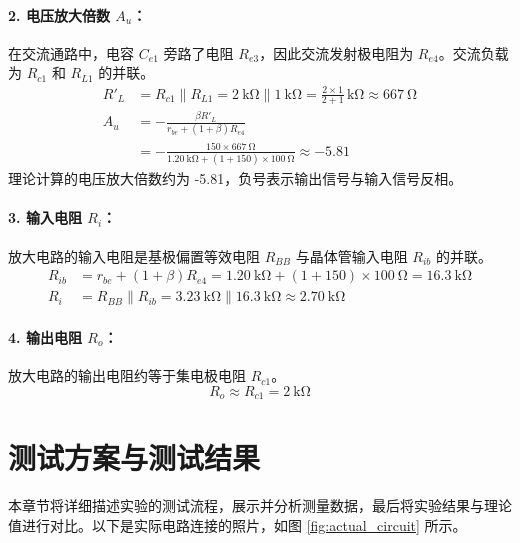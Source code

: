 \documentclass[UTF8, a4paper]{ctexrep} %
\begin{document}
\paragraph{2. 电压放大倍数 $A_u$：}
在交流通路中，电容 $C_{e1}$ 旁路了电阻 $R_{e3}$，因此交流发射极电阻为 $R_{e4}$。交流负载为 $R_{c1}$ 和 $R_{L1}$ 的并联。
\begin{align*}
    R'_L &= R_{c1} \parallel R_{L1} = \SI{2}{\kilo\ohm} \parallel \SI{1}{\kilo\ohm} = \frac{2 \times 1}{2+1}\,\si{\kilo\ohm} \approx \SI{667}{\ohm} \\
    A_u &= -\frac{\beta R'_L}{r_{be} + (1+\beta)R_{e4}} \\
        &= -\frac{150 \times \SI{667}{\ohm}}{\SI{1.20}{\kilo\ohm} + (1+150) \times \SI{100}{\ohm}} \approx -5.81
\end{align*}
理论计算的电压放大倍数约为 -5.81，负号表示输出信号与输入信号反相。

\paragraph{3. 输入电阻 $R_i$：}
放大电路的输入电阻是基极偏置等效电阻 $R_{BB}$ 与晶体管输入电阻 $R_{ib}$ 的并联。
\begin{align*}
    R_{ib} &= r_{be} + (1+\beta)R_{e4} = \SI{1.20}{\kilo\ohm} + (1+150) \times \SI{100}{\ohm} = \SI{16.3}{\kilo\ohm} \\
    R_i &= R_{BB} \parallel R_{ib} = \SI{3.23}{\kilo\ohm} \parallel \SI{16.3}{\kilo\ohm} \approx \SI{2.70}{\kilo\ohm}
\end{align*}

\paragraph{4. 输出电阻 $R_o$：}
放大电路的输出电阻约等于集电极电阻 $R_{c1}$。
\begin{equation*}
    R_o \approx R_{c1} = \SI{2}{\kilo\ohm}
\end{equation*}

\section{测试方案与测试结果}
\label{sec:results}

本章节将详细描述实验的测试流程，展示并分析测量数据，最后将实验结果与理论值进行对比。以下是实际电路连接的照片，如图 \ref{fig:actual_circuit} 所示。
\end{document}
